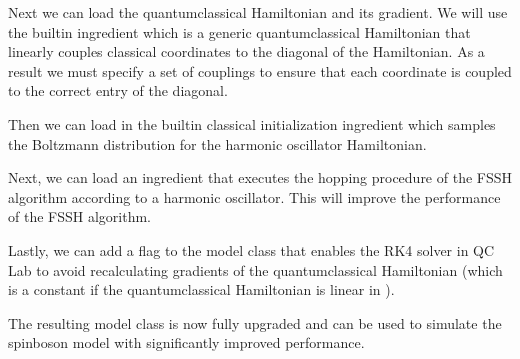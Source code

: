 \documentclass[letterpaper,10pt,english]{sphinxmanual}
\begin{document}
\sphinxAtStartPar
Next we can load the quantum\sphinxhyphen{}classical Hamiltonian and its gradient. We will use the built\sphinxhyphen{}in ingredient  which is a generic
quantum\sphinxhyphen{}classical Hamiltonian that linearly couples classical coordinates to the diagonal of the Hamiltonian. As a result we must specify a set of
couplings to ensure that each coordinate is coupled to the correct entry of the diagonal.

\sphinxAtStartPar
Then we can load in the built\sphinxhyphen{}in classical initialization ingredient which samples the Boltzmann distribution for the harmonic oscillator Hamiltonian.

\begin{sphinxVerbatim}[commandchars=\\\{\}]
  
\end{sphinxVerbatim}

\sphinxAtStartPar
Next, we can load an ingredient that executes the hopping procedure of the FSSH algorithm according to a harmonic oscillator. This will improve the
performance of the FSSH algorithm.

\begin{sphinxVerbatim}[commandchars=\\\{\}]
  
\end{sphinxVerbatim}

\sphinxAtStartPar
Lastly, we can add a flag to the model class that enables the RK4 solver in QC Lab to avoid recalculating gradients of the quantum\sphinxhyphen{}classical Hamiltonian
(which is a constant if the quantum\sphinxhyphen{}classical Hamiltonian is linear in ).

\begin{sphinxVerbatim}[commandchars=\\\{\}]
  
\end{sphinxVerbatim}

\sphinxAtStartPar
The resulting model class is now fully upgraded and can be used to simulate the spin\sphinxhyphen{}boson model with significantly improved performance.
\end{document}
